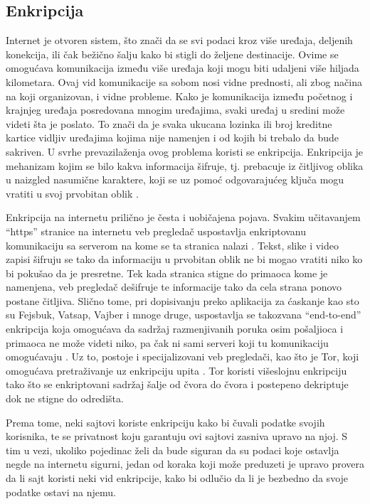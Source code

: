 \documentclass[a4paper]{article}
\begin{document}
\subsection{Enkripcija} 
Internet je otvoren sistem, što znači da se svi podaci kroz više uređaja, deljenih konekcija, ili čak bežično šalju kako bi stigli do željene destinacije. Ovime se omogućava komunikacija između više uređaja koji mogu biti udaljeni više hiljada kilometara. Ovaj vid komunikacije sa sobom nosi vidne prednosti, ali zbog načina na koji organizovan, i vidne probleme. Kako je komunikacija između početnog i krajnjeg uređaja posredovana mnogim uređajima, svaki uređaj u sredini može videti šta je poslato. To znači da je svaka ukucana lozinka ili broj kreditne kartice vidljiv uređajima kojima nije namenjen i od kojih bi trebalo da bude sakriven. U svrhe prevazilaženja ovog problema koristi se enkripcija. Enkripcija je mehanizam kojim se bilo kakva informacija šifruje, tj. prebacuje iz čitljivog oblika u naizgled nasumične karaktere, koji se uz pomoć odgovarajućeg ključa mogu vratiti u svoj prvobitan oblik \cite{dataencryption}. 
\par Enkripcija na internetu prilično je česta i uobičajena pojava. Svakim učitavanjem “https” stranice na internetu veb pregledač uspostavlja enkriptovanu komunikaciju sa serverom na kome se ta stranica nalazi \cite{enc1}. Tekst, slike i video zapisi šifruju se tako da informaciju u prvobitan oblik ne bi mogao vratiti niko ko bi pokušao da je presretne. Tek kada stranica stigne do primaoca kome je namenjena, veb pregledač dešifruje te informacije tako da cela strana ponovo postane čitljiva. Slično tome, pri dopisivanju preko aplikacija za ćaskanje kao sto su Fejsbuk, Vatsap, Vajber i mnoge druge, uspostavlja se takozvana “end-to-end” enkripcija koja omogućava da sadržaj razmenjivanih poruka osim pošaljioca i primaoca ne može videti niko, pa čak ni sami serveri koji tu komunikaciju omogućavaju \cite{enc2}. Uz to, postoje i specijalizovani veb pregledači, kao što je Tor, koji omogućava pretraživanje uz enkripciju upita \cite{enc3}. Tor koristi višeslojnu enkripciju tako što se enkriptovani sadržaj šalje od čvora do čvora i postepeno dekriptuje dok ne stigne do odredišta.
\par Prema tome, neki sajtovi koriste enkripciju kako bi čuvali podatke svojih korisnika, te se privatnost koju garantuju ovi sajtovi zasniva upravo na njoj. S tim u vezi, ukoliko pojedinac želi da bude siguran da su podaci koje ostavlja negde na internetu sigurni, jedan od koraka koji može preduzeti je upravo provera da li sajt koristi neki vid enkripcije, kako bi odlučio da li je bezbedno da svoje podatke ostavi na njemu. 
\end{document}
